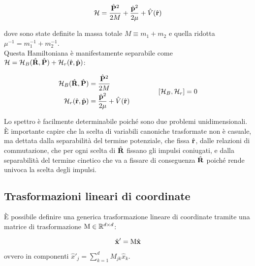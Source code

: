 \begin{equation}
	\mathcal{H} = \frac{\hat{\mathbf{P}}^2}{2M} + \frac{\hat{\mathbf{p}}^2}{2\mu} + \hat{V}(\hat{\mathbf{r}})
	\label{eq:21}
\end{equation}

dove sono state definite la massa totale $ M \equiv m_1 + m_2 $ e quella ridotta $ \mu^{-1} = m_1^{-1} + m_2^{-1} $.\\
Questa Hamiltoniana è manifestamente separabile come $ \mathcal{H} = \mathcal{H}_B(\hat{\mathbf{R}}, \hat{\mathbf{P}}) + \mathcal{H}_r(\hat{\mathbf{r}}, \hat{\mathbf{p}}) $:

\begin{equation}
	\begin{split}
		\mathcal{H}_B(\hat{\mathbf{R}}, \hat{\mathbf{P}}) &= \frac{\hat{\mathbf{P}}^2}{2M}\\
		\mathcal{H}_r(\hat{\mathbf{r}}, \hat{\mathbf{p}}) &= \frac{\hat{\mathbf{p}}^2}{2\mu} + \hat{V}(\hat{\mathbf{r}})
	\end{split}
	\label{eq:22}
	\qquad\qquad \left[\mathcal{H}_B, \mathcal{H}_r\right] = 0
\end{equation}

Lo spettro è facilmente determinabile poiché sono due problemi unidimensionali.\\
È importante capire che la scelta di variabili canoniche trasformate non è casuale, ma dettata dalla separabilità del termine potenziale, che fissa $ \hat{\mathbf{r}} $, dalle relazioni di commutazione, che per ogni scelta di $ \hat{\mathbf{R}} $ fissano gli impulsi coniugati, e dalla separabilità del termine cinetico che va a fissare di conseguenza $ \hat{\mathbf{R}} $ poiché rende univoca la scelta degli impulsi.

\subsection{Trasformazioni lineari di coordinate}

È possibile definire una generica trasformazione lineare di coordinate tramite una matrice di trasformazione $ \mathbf{\text{M}}\in\mathbb{R}^{d\times d} $:

\begin{equation}
	\hat{\mathbf{x}}' = \mathbf{\text{M}} \hat{\mathbf{x}}
	\label{eq:23}
\end{equation}

ovvero in componenti $ \hat{x}'_j = \sum_{k = 1}^{d} M_{jk} \hat{x}_k $.

